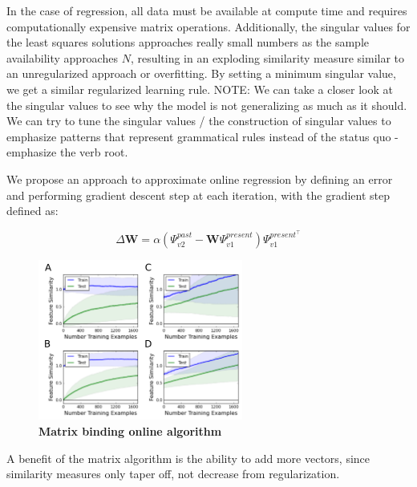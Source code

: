 \documentclass{article}
\begin{document}
In the case of regression, all data must be available at compute time and requires computationally expensive matrix operations. Additionally, the singular values for the least squares solutions approaches really small numbers as the sample availability approaches $N$, resulting in an exploding similarity measure similar to an unregularized approach or overfitting. By setting a minimum singular value, we get a similar regularized learning rule. 
NOTE: We can take a closer look at the singular values to see why the model is not generalizing as much as it should. We can try to tune the singular values / the construction of singular values to emphasize patterns that represent grammatical rules instead of the status quo - emphasize the verb root.

We propose an approach to approximate online regression by defining an error and performing gradient descent step at each iteration, with the gradient step defined as:

\begin{equation}
\Delta \mathbf{W} = \alpha (\Psi^{past}_{v2} - \mathbf{W} \Psi^{present}_{v1}) \Psi^{present^\top}_{v1}
\end{equation}


\begin{figure}[h]
\centering
\includegraphics[width=0.6\textwidth]{outer_product_algorithm-170518.png}
\caption{\textbf{Matrix binding online algorithm}}
\end{figure}

A benefit of the matrix algorithm is the ability to add more vectors, since similarity measures only taper off, not decrease from regularization.
\end{document}
